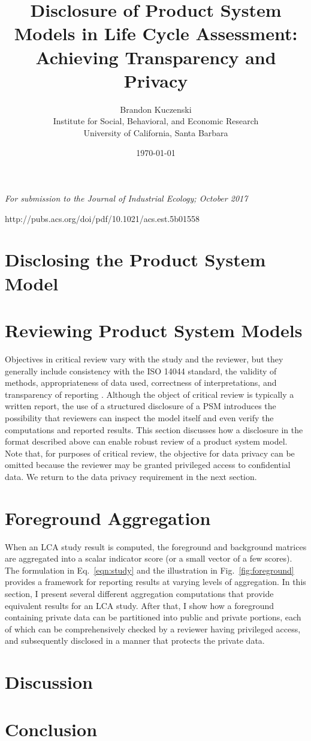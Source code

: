 \documentclass[12pt]{article}
\title{Disclosure of Product System Models in Life Cycle Assessment: Achieving Transparency and Privacy}
\author{Brandon Kuczenski\\
Institute for Social, Behavioral, and Economic Research\\
University of California, Santa Barbara}
\date{\mydate\today}
\def\mainpaper{

  \maketitle
  \emph{For submission to the Journal of Industrial Ecology; October 2017}

  

  \doublespacing

  {\red http://pubs.acs.org/doi/pdf/10.1021/acs.est.5b01558}

  
\section{Disclosing the Product System Model}

  
  


\section{Reviewing Product System Models}

Objectives in critical review vary with the study and the reviewer, but they generally include consistency with the ISO 14044 standard, the validity of methods, appropriateness of data used, correctness of interpretations, and transparency of reporting \citep[Section 6.1]{iso14044}.  Although the object of critical review is typically a written report, the use of a structured disclosure of a PSM introduces the possibility that reviewers can inspect the model itself and even verify the computations and reported results.  This section discusses how a disclosure in the format described above can enable robust review of a product system model.  Note that, for purposes of critical review, the objective for data privacy can be omitted because the reviewer may be granted privileged access to confidential data.  We return to the data privacy requirement in the next section.

  

\section{Foreground Aggregation}

When an LCA study result is computed, the foreground and background matrices are aggregated into a scalar indicator score (or a small vector of a few scores).  The formulation in Eq.~\ref{eqn:study} and the illustration in Fig.~\ref{fig:foreground} provides a framework for reporting results at varying levels of aggregation.  In this section, I present several different aggregation computations that provide equivalent results for an LCA study.   After that, I show how a foreground containing private data can be partitioned into public and private portions, each of which can be comprehensively checked by a reviewer having privileged access, and subsequently disclosed in a manner that protects the private data.



\section{Discussion}



\section{Conclusion} 


%  

%  
  
%  
  
%  

%  

 \singlespacing
 
}
\def\supporting{
  \renewcommand{\thefigure}{S\arabic{figure}}
  \renewcommand{\thetable}{S\arabic{table}}

  \maketitle

  \begin{center}
    \Large Supporting Information
  \end{center}


  
  
%  

%  
  
%  
  
%  

  \singlespacing
}
\def\unused{
  
}
\begin{document}
\mainpaper

\end{document}
